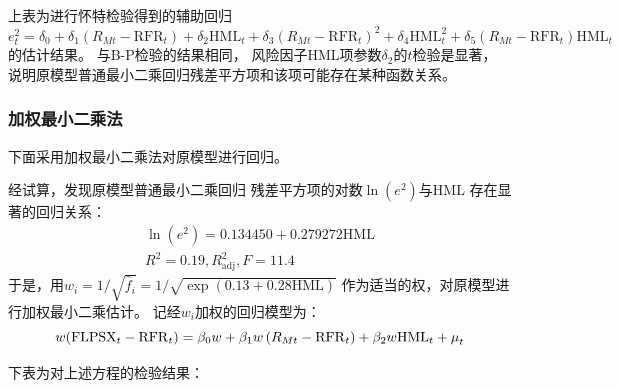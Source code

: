\documentclass[UTF8]{ctexart}
\begin{document}
上表为进行怀特检验得到的辅助回归
$e_{t}^{2}=\delta _0+\delta _1\left( R_{Mt}-\mathrm{RFR}_t \right) +\delta _2\mathrm{HML}_t+\delta _3\left( R_{Mt}-\mathrm{RFR}_t \right) ^2+\delta _4\mathrm{HML}_{t}^{2}+\delta _5\left( R_{Mt}-\mathrm{RFR}_t \right) \mathrm{HML}_t$
的估计结果。
与B-P检验的结果相同，
风险因子HML项参数$\delta_2$的$t$检验是显著，
说明原模型普通最小二乘回归残差平方项和该项可能存在某种函数关系。

\subsubsection{加权最小二乘法}

下面采用加权最小二乘法对原模型进行回归。


经试算，发现原模型普通最小二乘回归
残差平方项的对数$\ln(e^2)$与$\text{HML}$
存在显著的回归关系：
\begin{eqnarray}
  \ln(e^2)=0.134450+0.279272\text{HML}
  \\
  R^2=0.19,R^2_{\text{adj}},F=11.4
\end{eqnarray}
于是，用$w_i=1/\sqrt{\hat{f}_i}=1/\sqrt{\exp(0.13+0.28\text{HML})}$
作为适当的权，对原模型进行加权最小二乘估计。
记经$w_i$加权的回归模型为：
\begin{equation}
  w(\text{FLPSX}_t-\mathrm{RFR}_t)=\beta_0w+\beta_1w\left( R_{Mt}-\mathrm{RFR}_t \right)+\beta_2w\mathrm{HML}_t + \mu^{\*}_t
\end{equation}

下表为对上述方程的检验结果：
\end{document}
